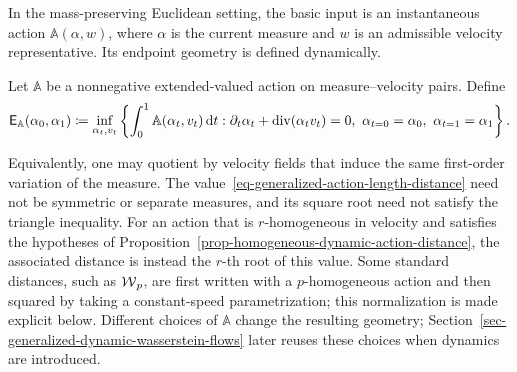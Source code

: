 In the mass-preserving Euclidean setting, the basic input is an instantaneous action $\mathbb A(\alpha,w)$, where \(\alpha\) is the current measure and \(w\) is an admissible velocity representative. Its endpoint geometry is defined dynamically.
\begin{defn}\label{def-generalized-dynamic-action-distance}
Let $\mathbb A$ be a nonnegative extended-valued action on measure--velocity pairs. Define
\begin{equation}\label{eq-generalized-action-length-distance}
	\mathsf E_{\mathbb A}(\alpha_0,\alpha_1)
	\coloneqq
	\inf_{\alpha_t,v_t}
	\left\{
	\int_0^1 \mathbb A(\alpha_t,v_t)\,\mathrm{d} t
	:
	\partial_t\alpha_t+
	\operatorname{div}(\alpha_t v_t)=0,\
	\alpha_{t=0}=\alpha_0,\
		\alpha_{t=1}=\alpha_1
	\right\}.
\end{equation}
\end{defn}
Equivalently, one may quotient by velocity fields that induce the same first-order variation of the measure. The value~\eqref{eq-generalized-action-length-distance} need not be symmetric or separate measures, and its square root need not satisfy the triangle inequality. For an action that is $r$-homogeneous in velocity and satisfies the hypotheses of Proposition~\ref{prop-homogeneous-dynamic-action-distance}, the associated distance is instead the $r$-th root of this value. Some standard distances, such as \(\operatorname{\mathcal{W}}_p\), are first written with a \(p\)-homogeneous action and then squared by taking a constant-speed parametrization; this normalization is made explicit below. Different choices of \(\mathbb A\) change the resulting geometry; Section~\ref{sec-generalized-dynamic-wasserstein-flows} later reuses these choices when dynamics are introduced.

